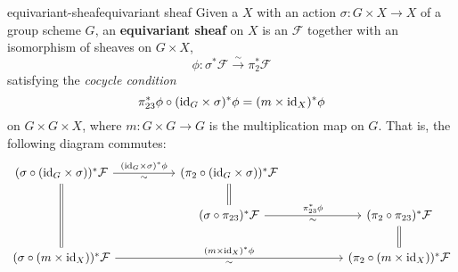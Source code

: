 \begin{topic}{equivariant-sheaf}{equivariant sheaf}
    Given a  $X$ with an action $\sigma : G \times X \to X$ of a group scheme $G$, an \textbf{equivariant sheaf} on $X$ is an  $\mathcal{F}$ together with an isomorphism of sheaves on $G \times X$,
    \[ \phi : \sigma^* \mathcal{F} \xrightarrow{\sim} \pi_2^* \mathcal{F} \]
    satisfying the \textit{cocycle condition}
    \[ \pi_{23}^* \phi \circ (\textup{id}_G \times \sigma)^* \phi = (m \times \textup{id}_X)^* \phi \]
    on $G \times G \times X$, where $m : G \times G \to G$ is the multiplication map on $G$. That is, the following diagram commutes:
    \[ \begin{tikzcd}[column sep=5em]
        (\sigma \circ (\id_G \times \sigma))^* \mathcal{F} \arrow["\sim{}"']{r}{(\id_G \times \sigma)^* \phi} \arrow[equal]{dd} & (\pi_2 \circ (\id_G \times \sigma))^* \mathcal{F} \arrow[equal]{d} & \\ & (\sigma \circ \pi_{23})^* \mathcal{F} \arrow["\sim{}"']{r}{\pi_{23}^* \phi} & (\pi_2 \circ \pi_{23})^* \mathcal{F} \arrow[equal]{d} \\ (\sigma \circ (m \times \id_X))^* \mathcal{F} \arrow["\sim{}"']{rr}{(m \times \id_X)^* \phi} & & (\pi_2 \circ (m \times \id_X))^* \mathcal{F}
    \end{tikzcd} \]
\end{topic}

